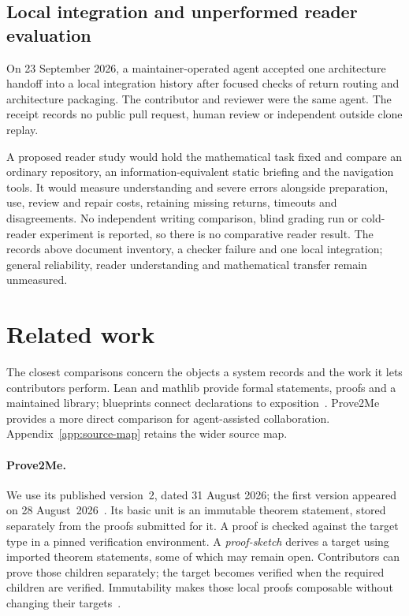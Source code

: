 \documentclass[10pt]{article}
\begin{document}
\subsection{Local integration and unperformed reader evaluation}
On 23 September 2026, a maintainer-operated agent accepted one architecture handoff into a local integration history after focused checks of return routing and architecture packaging.
The contributor and reviewer were the same agent. The receipt records no public pull request, human review or independent outside clone replay.

A proposed reader study would hold the mathematical task fixed and compare an ordinary repository, an information-equivalent static briefing and the navigation tools.
It would measure understanding and severe errors alongside preparation, use, review and repair costs, retaining missing returns, timeouts and disagreements.
No independent writing comparison, blind grading run or cold-reader experiment is reported, so there is no comparative reader result.
The records above document inventory, a checker failure and one local integration; general reliability, reader understanding and mathematical transfer remain unmeasured.

\section{Related work}\label{sec:related}\label{app:credit}
The closest comparisons concern the objects a system records and the work it lets contributors perform. Lean and mathlib provide formal statements, proofs and a maintained library; blueprints connect declarations to exposition~\cite{lean4,mathlib,leanblueprint}. Prove2Me provides a more direct comparison for agent-assisted collaboration. Appendix~\ref{app:source-map} retains the wider source map.
\paragraph{Prove2Me.}
We use its published version~2, dated 31 August 2026; the first version appeared on 28 August~2026~\cite{prove2me}. Its basic unit is an immutable theorem statement, stored separately from the proofs submitted for it. A proof is checked against the target type in a pinned verification environment. A \emph{proof-sketch} derives a target using imported theorem statements, some of which may remain open. Contributors can prove those children separately; the target becomes verified when the required children are verified. Immutability makes those local proofs composable without changing their targets~\cite[Sections~3.1--3.2 and~4.2]{prove2me}.
\end{document}
